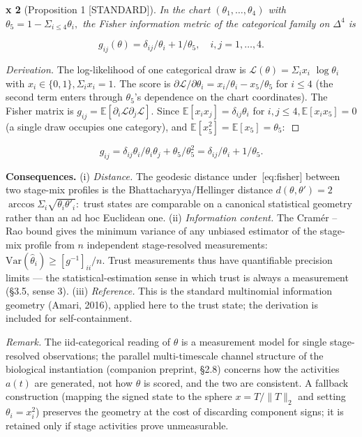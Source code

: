 \documentclass[
]{article}
\begin{document}
\textbf{x 2} (Proposition 1 {[}STANDARD{]}). \emph{In the chart
\((\theta_{1}, \ldots, \theta_{4})\) with
\(\theta_{5} = 1 - \Sigma_{i\leq4} \theta_i,\) the Fisher information
metric of the categorical family on \(\Delta^{4}\) is}

\begin{equation}
g_{ij}(\theta) = \delta_{ij}/\theta_i + 1/\theta_{5}, \quad i, j = 1, \ldots, 4.
\label{eq:fisher}
\end{equation}

\emph{Derivation.} The log-likelihood of one categorical draw is
\(\mathcal{L}(\theta) = \Sigma_{i} x_i\) \(\log \theta_i\) with
\(x_i \in \{0, 1\}, \Sigma_{i} x_i = 1.\) The score is
\(\partial \mathcal{L}/\partial \theta_i = x_i/\theta_i - x_{5}/\theta_{5}\)
for \(i \leq 4\) (the second term enters through \(\theta_{5}\)'s
dependence on the chart coordinates). The Fisher matrix is
\(g_{ij} = \mathbb{E}[\partial_i \mathcal{L} \partial_j \mathcal{L}].\)
Since \(\mathbb{E}[x_i x_j] = \delta_{ij}\theta_i\) for
\(i, j \leq 4, \mathbb{E}[x_i x_{5}] = 0\) (a single draw occupies one
category), and
\(\mathbb{E}[x_{5}^{2}] = \mathbb{E}[x_{5}] = \theta_{5}:\)~◻

\begin{equation}
g_{ij} = \delta_{ij}\theta_i/\theta_i\theta_j + \theta_{5}/\theta_{5}^{2} = \delta_{ij}/\theta_i + 1/\theta_{5}.
\label{eq:fisherderive}
\end{equation}

\textbf{Consequences.} (i) \emph{Distance.} The geodesic distance
under~{[}eq:fisher{]} between two stage-mix profiles is the
Bhattacharyya/Hellinger distance \(d(\theta, \theta') = 2\)
\(\arccos \Sigma_{i} \sqrt{\theta_i \theta'_i}:\) trust states are
comparable on a canonical statistical geometry rather than an ad hoc
Euclidean one. (ii) \emph{Information content.} The Cramér -- Rao bound
gives the minimum variance of any unbiased estimator of the stage-mix
profile from \(n\) independent stage-resolved measurements:
\(\mathrm{Var}(\hat{\theta}_i) \geq [g^{-1}]_{ii}/n.\) Trust
measurements thus have quantifiable precision limits --- the
statistical-estimation sense in which trust is always a measurement
(§3.5, sense 3). (iii) \emph{Reference.} This is the standard
multinomial information geometry (Amari, 2016), applied here to the
trust state; the derivation is included for self-containment.

\emph{Remark.} The iid-categorical reading of \(\theta\) is a
measurement model for single stage-resolved observations; the parallel
multi-timescale channel structure of the biological instantiation
(companion preprint, §2.8) concerns how the activities \(a(t)\) are
generated, not how \(\theta\) is scored, and the two are consistent. A
fallback construction (mapping the signed state to the sphere
\(x = T/\| T\|_{2}\) and setting \(\theta_i = x_i^{2}\)) preserves the
geometry at the cost of discarding component signs; it is retained only
if stage activities prove unmeasurable.
\end{document}

